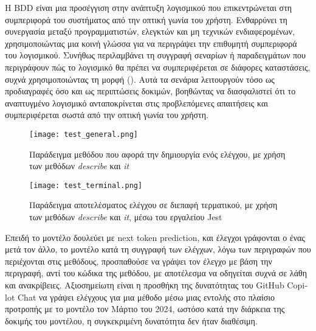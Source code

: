 Η \textlatin{BDD} είναι μια προσέγγιση στην ανάπτυξη λογισμικού που
επικεντρώνεται στη συμπεριφορά του συστήματος από την οπτική γωνία του
χρήστη. Ενθαρρύνει τη συνεργασία μεταξύ προγραμματιστών, ελεγκτών και μη
τεχνικών ενδιαφερομένων, χρησιμοποιώντας μια κοινή γλώσσα για να
περιγράψει την επιθυμητή συμπεριφορά του λογισμικού. Συνήθως
περιλαμβάνει τη συγγραφή σεναρίων ή παραδειγμάτων που περιγράφουν πώς το
λογισμικό θα πρέπει να συμπεριφέρεται σε διάφορες καταστάσεις, συχνά
χρησιμοποιώντας τη μορφή 
(). Αυτά τα σενάρια λειτουργούν τόσο ως
προδιαγραφές όσο και ως περιπτώσεις δοκιμών, βοηθώντας να διασφαλιστεί
ότι το αναπτυγμένο λογισμικό ανταποκρίνεται στις προβλεπόμενες
απαιτήσεις και συμπεριφέρεται σωστά από την οπτική γωνία του χρήστη.
\cite{bddstudy,mughal2024advancingbddsoftwaretesting,bddsystematic}

\begin{figure}[H]
  \begin{center}
    \texttt{[image: test\_general.png]}
    \label{fig:TestGeneral}
    \caption{Παράδειγμα μεθόδου που αφορά την δημιουργία ενός ελέγχου,
      με χρήση των μεθόδων \textit{\textlatin{describe}} και
      \textit{\textlatin{it}}}
  \end{center}
\end{figure}

\begin{figure}[H]
  \begin{center}
    \texttt{[image: test\_terminal.png]}
    \label{fig:TestGeneralTerminal}
    \caption{Παράδειγμα αποτελέσματος ελέγχου σε διεπαφή τερματικού, με
      χρήση των μεθόδων \textit{\textlatin{describe}} και
      \textit{\textlatin{it}}, μέσω του εργαλείου \textlatin{Jest}}
  \end{center}
\end{figure}

Επειδή το μοντέλο δουλεύει με \textlatin{next token prediction}, και
έλεγχοι γράφονται ο ένας μετά τον άλλο, το μοντέλο κατά τη συγγραφή των
ελέγχων, λόγω των περιγραφών που περιέχονται στις μεθόδους, προσπαθούσε
να γράψει τον έλεγχο με βάση την περιγραφή, αντί του κώδικα της μεθόδου,
με αποτέλεσμα να οδηγείται συχνά σε λάθη και ανακρίβειες. Αξιοσημείωτη
είναι η προσθήκη της δυνατότητας του \textlatin{GitHub Copilot Chat} να
γράψει ελέγχους για μια μέθοδο μέσω μιας εντολής στο πλαίσιο προτροπής
με το μοντέλο \cite{copilotchattips} τον Μάρτιο του 2024, ωστόσο κατά
την διάρκεια της δοκιμής του μοντέλου, η συγκεκριμένη δυνατότητα δεν
ήταν διαθέσιμη.

